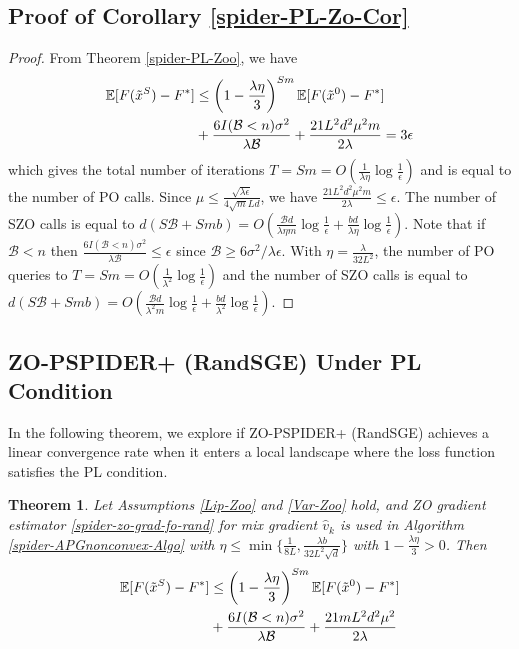 \documentclass[iicol,sn-basic]{sn-jnl}
\theoremstyle{thmstyleone}%
\newtheorem{theorem}{Theorem}%
\theoremstyle{thmstyletwo}%
\theoremstyle{thmstylethree}%
\newcommand*{\E}{\mathbb{E}}
\begin{document}
\noindent\subsection{Proof of Corollary \ref{spider-PL-Zo-Cor}}

\begin{proof}
From Theorem \ref{spider-PL-Zoo}, we have
\begin{align}
\E[F(\tilde{x}^S) - {F}^*] & \leq   \left(1-\frac{\lambda\eta}{3}\right)^{Sm} \E[F(\tilde{x}^0) - {F}^*] \notag\\
&+ \frac{6I(\mathcal{B} < n) \sigma ^2}{\lambda\mathcal{B}}+\frac{21 L^2 d^2 \mu^2 m}{2\lambda}= 3 \epsilon\notag
\end{align}
which gives the total number of iterations $T = Sm = O(\frac{1}{\lambda\eta}\log\frac{1}{\epsilon})$ and is equal to the number of PO calls. Since $\mu \leq \frac{\sqrt{\lambda\epsilon}}{4 \sqrt{m} L d }$, we have $\frac{21 L^2 d^2 \mu^2 m}{2\lambda} \leq \epsilon$. The number of SZO calls is equal to $d(S\mathcal{B}+Smb) = O(\frac{\mathcal{B}d}{\lambda\eta m}\log\frac{1}{\epsilon}+\frac{bd}{\lambda\eta}\log\frac{1}{\epsilon})$.  Note that if $\mathcal{B} < n$ then $\frac{6I(\mathcal{B} < n) \sigma ^2}{\lambda\mathcal{B}} \leq \epsilon$ since $\mathcal{B} \geq 6 {\sigma ^2}/{\lambda \epsilon}$. With $\eta = \frac{\lambda}{32 L^2}$, the number of PO  queries to $T = Sm = O(\frac{1}{\lambda^2}\log\frac{1}{\epsilon})$ and the number of SZO calls is equal to $d(S\mathcal{B}+Smb) = O(\frac{\mathcal{B}d}{\lambda^2 m}\log\frac{1}{\epsilon}+\frac{bd}{\lambda^2}\log\frac{1}{\epsilon})$.
\end{proof}

\subsection{ZO-PSPIDER+ (RandSGE) Under PL Condition}
In the following theorem, we explore if ZO-PSPIDER+ (RandSGE) achieves a linear convergence rate when it enters a local landscape where the loss function satisfies the PL condition.
\begin{theorem}\label{spider-PL-Zoo-rand}
Let Assumptions \ref{Lip-Zoo} and \ref{Var-Zoo} hold, and  ZO gradient estimator \eqref{spider-zo-grad-fo-rand} for mix gradient $\hat{v}_k$ is used in
 Algorithm \ref{spider-APGnonconvex-Algo} with $\eta \leq \min\{\frac{1}{8L}, \frac{\lambda b}{32 L^2\sqrt{d}}\}$ with $1 - \frac{\lambda\eta}{3} > 0$. Then 
\begin{align}
\E[F(\tilde{x}^S) - {F}^*] & \leq   \left(1-\frac{\lambda\eta}{3}\right)^{Sm} \E[F(\tilde{x}^0) - {F}^*]\notag\\
& + \frac{6I(\mathcal{B} < n) \sigma ^2}{\lambda \mathcal{B}}+\frac{21  m L^2 d^2 \mu^2}{2\lambda}\label{spider-PL-eq-error-rand}
\end{align}
\end{theorem}
\end{document}

